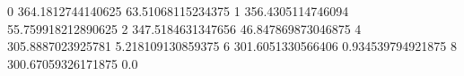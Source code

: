 0 364.1812744140625 63.51068115234375
1 356.4305114746094 55.759918212890625
2 347.5184631347656 46.847869873046875
4 305.8887023925781 5.218109130859375
6 301.6051330566406 0.934539794921875
8 300.67059326171875 0.0
